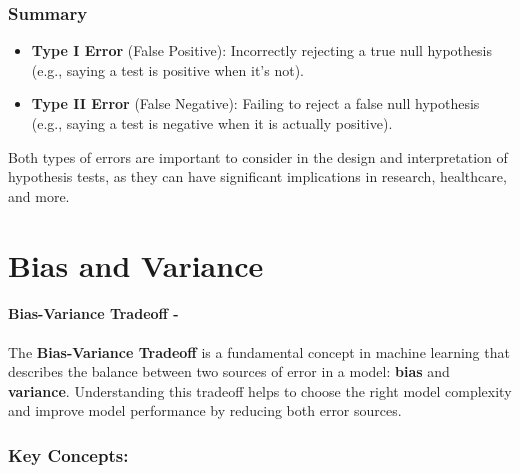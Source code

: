 \documentclass[12pt]{book}
\providecommand{\tightlist}{%
  \setlength{\itemsep}{0pt}\setlength{\parskip}{0pt}}
\begin{document}
\subsubsection{Summary}\label{summary}

\begin{itemize}
\tightlist
\item
  \textbf{Type I Error} (False Positive): Incorrectly rejecting a true
  null hypothesis (e.g., saying a test is positive when it's not).
\item
  \textbf{Type II Error} (False Negative): Failing to reject a false
  null hypothesis (e.g., saying a test is negative when it is actually
  positive).
\end{itemize}

Both types of errors are important to consider in the design and
interpretation of hypothesis tests, as they can have significant
implications in research, healthcare, and more.

\clearpage

\section{Bias and Variance}

\paragraph*{Bias-Variance Tradeoff -}The \textbf{Bias-Variance Tradeoff} is a fundamental concept in machine learning that describes the balance between two sources of error in a model: \textbf{bias} and \textbf{variance}. Understanding this tradeoff helps to choose the right model complexity and improve model performance by reducing both error sources.

\subsubsection*{Key Concepts:}
\end{document}
